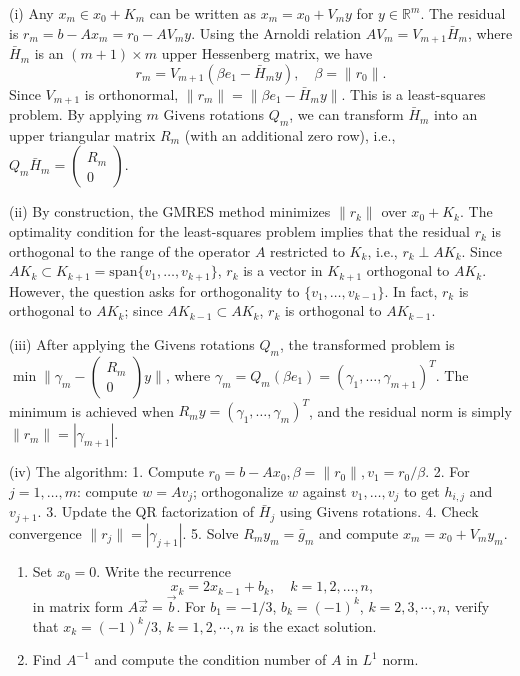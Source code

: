 \begin{solution}
(i) Any $x_m \in x_0 + K_m$ can be written as $x_m = x_0 + V_m y$ for $y \in \mathbb{R}^m$. The residual is $r_m = b - Ax_m = r_0 - AV_m y$. Using the Arnoldi relation $AV_m = V_{m+1} \bar{H}_m$, where $\bar{H}_m$ is an $(m+1) \times m$ upper Hessenberg matrix, we have
\[
r_m = V_{m+1} (\beta e_1 - \bar{H}_m y), \quad \beta = \|r_0\|.
\]
Since $V_{m+1}$ is orthonormal, $\|r_m\| = \|\beta e_1 - \bar{H}_m y\|$. This is a least-squares problem. By applying $m$ Givens rotations $Q_m$, we can transform $\bar{H}_m$ into an upper triangular matrix $R_m$ (with an additional zero row), i.e., $Q_m \bar{H}_m = \begin{pmatrix} R_m \\ 0 \end{pmatrix}$.

(ii) By construction, the GMRES method minimizes $\|r_k\|$ over $x_0 + K_k$. The optimality condition for the least-squares problem implies that the residual $r_k$ is orthogonal to the range of the operator $A$ restricted to $K_k$, i.e., $r_k \perp AK_k$. Since $AK_k \subset K_{k+1} = \text{span}\{v_1, \dots, v_{k+1}\}$, $r_k$ is a vector in $K_{k+1}$ orthogonal to $AK_k$. However, the question asks for orthogonality to $\{v_1, \dots, v_{k-1}\}$. In fact, $r_k$ is orthogonal to $AK_k$; since $AK_{k-1} \subset AK_k$, $r_k$ is orthogonal to $AK_{k-1}$.

(iii) After applying the Givens rotations $Q_m$, the transformed problem is $\min \| \gamma_m - \begin{pmatrix} R_m \\ 0 \end{pmatrix} y \|$, where $\gamma_m = Q_m (\beta e_1) = (\gamma_1, \dots, \gamma_{m+1})^T$. The minimum is achieved when $R_m y = (\gamma_1, \dots, \gamma_m)^T$, and the residual norm is simply $\|r_m\| = |\gamma_{m+1}|$.

(iv) The algorithm: 1. Compute $r_0 = b - Ax_0, \beta = \|r_0\|, v_1 = r_0/\beta$. 2. For $j=1, \dots, m$: compute $w = Av_j$; orthogonalize $w$ against $v_1, \dots, v_j$ to get $h_{i,j}$ and $v_{j+1}$. 3. Update the QR factorization of $\bar{H}_j$ using Givens rotations. 4. Check convergence $\|r_j\| = |\gamma_{j+1}|$. 5. Solve $R_m y_m = \bar{g}_m$ and compute $x_m = x_0 + V_m y_m$.
\end{solution}

\begin{exercise}
\label{applied:2014:5}

\begin{enumerate}
\item[(i)] Set $x_{0}=0$. Write the recurrence
\[
x_{k}=2x_{k-1}+b_{k},\quad k=1,2,\dots,n,
\]
in matrix form $A\overrightarrow{x}=\overrightarrow{b}$. For $b_{1}=-1/3$, $b_{k}=(-1)^{k}$, $k=2,3,\cdots,n$, verify that $x_{k}=(-1)^{k}/3$, $k=1,2,\cdots,n$ is the exact solution.
\item[(ii)] Find $A^{-1}$ and compute the condition number of $A$ in $L^{1}$ norm.
\end{enumerate}
\end{exercise}

